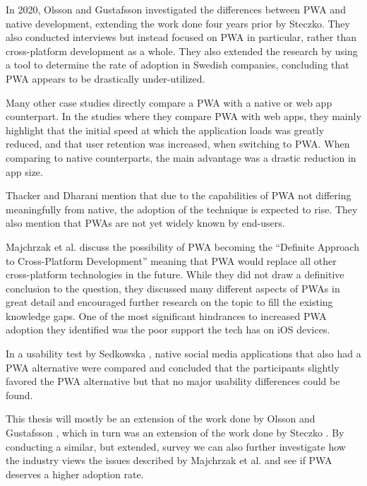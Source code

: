 \documentclass[a4paper,12pt]{article}
\begin{document}
In 2020, Olsson and Gustafsson \cite{thesis_sverige} investigated the differences between PWA and native development, extending the work done four years prior by Steczko. They also conducted interviews but instead focused on PWA in particular, rather than cross-platform development as a whole. They also extended the research by using a tool to determine the rate of adoption in Swedish companies, concluding that PWA appears to be drastically under-utilized.

Many other case studies \cite{casestudies_mia, thesis_pwa_2017, casestudies_google_1, casestudies_google_2, realize_native_with_pwa} directly compare a PWA with a native or web app counterpart. In the studies where they compare PWA with web apps, they mainly highlight that the initial speed at which the application loads was greatly reduced, and that user retention was increased, when switching to PWA. When comparing to native counterparts, the main advantage was a drastic reduction in app size.

Thacker and Dharani \cite{realize_native_with_pwa} mention that due to the capabilities of PWA not differing meaningfully from native, the adoption of the technique is expected to rise. They also mention that PWAs are not yet widely known by end-users.

Majchrzak et al. \cite{pwa_definite_approach} discuss the possibility of PWA becoming the “Definite Approach to Cross-Platform Development” meaning that PWA would replace all other cross-platform technologies in the future. While they did not draw a definitive conclusion to the question, they discussed many different aspects of PWAs in great detail and encouraged further research on the topic to fill the existing knowledge gaps. One of the most significant hindrances to increased PWA adoption they identified was the poor support the tech has on iOS devices.

In a usability test by Sedkowska \cite{thesis_pwa_ux}, native social media applications that also had a PWA alternative were compared and concluded that the participants slightly favored the PWA alternative but that no major usability differences could be found.

This thesis will mostly be an extension of the work done by Olsson and Gustafsson \cite{thesis_sverige}, which in turn was an extension of the work done by Steczko \cite{thesis_steczko}. By conducting a similar, but extended, survey we can also further investigate how the industry views the issues described by Majchrzak et al. \cite{pwa_definite_approach} and see if PWA deserves a higher adoption rate.
\end{document}
